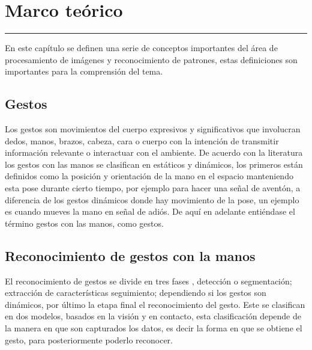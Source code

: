 \chapter{Marco te\'orico}\label{capit:cap2}
\vspace{-2.0325ex}%
\noindent
\rule{\textwidth}{0.5pt}
\vspace{-5.5ex}%
\newcommand{\pushline}{\Indp}%

En este capítulo se definen una serie de conceptos importantes del área de procesamiento de imágenes y reconocimiento de patrones, estas definiciones son importantes para la comprensión del tema.



\section{Gestos}\label{sec:2Gestos}
Los gestos \citep{Mitra2007} son movimientos del cuerpo expresivos y significativos que involucran dedos, manos, brazos, cabeza, cara o cuerpo con la intención de transmitir información relevante o interactuar con el ambiente. De acuerdo con la literatura \citep{Mitra2007} los gestos con las manos se clasifican en estáticos y dinámicos, los primeros están definidos como la posición y orientación de la mano en el espacio manteniendo esta pose durante cierto tiempo, por ejemplo para hacer una se\~nal de aventón, a diferencia de los gestos dinámicos donde hay movimiento de la pose, un ejemplo  es cuando mueves la mano en se\~nal de adiós. De aquí en adelante entiéndase el término gestos con las manos, como gestos.  



\section{Reconocimiento de gestos con la manos}\label{sec:2ReconocimientoGestos}  

 

El reconocimiento de gestos se divide en tres fases \citep{Rautaray2012}, detección o segmentación; extracción de características seguimiento; dependiendo si los gestos son dinámicos, por último la etapa final el reconocimiento del gesto.  
Este se clasifican en dos modelos, basados en la visión y en contacto, esta clasificación depende de la manera en que son capturados los datos, es decir la forma en que se obtiene el gesto, para posteriormente poderlo reconocer. 

